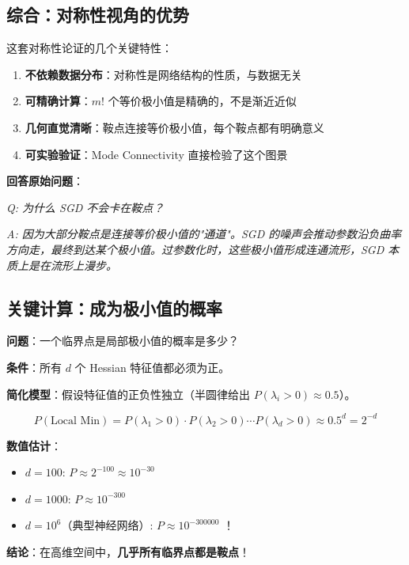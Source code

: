 \documentclass[12pt, a4paper]{ctexart}
\begin{document}
\subsection{综合：对称性视角的优势}

\begin{keypoint}[对称性视角的优势]

这套对称性论证的几个关键特性：

\begin{enumerate}
    \item \textbf{不依赖数据分布}：对称性是网络结构的性质，与数据无关
    \item \textbf{可精确计算}：$m!$ 个等价极小值是精确的，不是渐近近似
    \item \textbf{几何直觉清晰}：鞍点连接等价极小值，每个鞍点都有明确意义
    \item \textbf{可实验验证}：Mode Connectivity 直接检验了这个图景
\end{enumerate}

\textbf{回答原始问题}：

\textit{Q: 为什么 SGD 不会卡在鞍点？}

\textit{A: 因为大部分鞍点是连接等价极小值的"通道"。SGD 的噪声会推动参数沿负曲率方向走，最终到达某个极小值。过参数化时，这些极小值形成连通流形，SGD 本质上是在流形上漫步。}
\end{keypoint}

\subsection{关键计算：成为极小值的概率}

\begin{blackboard}

\textbf{问题}：一个临界点是局部极小值的概率是多少？

\textbf{条件}：所有 $d$ 个 Hessian 特征值都必须为正。

\textbf{简化模型}：假设特征值的正负性独立（半圆律给出 $P(\lambda_i > 0) \approx 0.5$）。

\[
P(\text{Local Min}) = P(\lambda_1 > 0) \cdot P(\lambda_2 > 0) \cdots P(\lambda_d > 0) \approx 0.5^d = 2^{-d}
\]

\textbf{数值估计}：
\begin{itemize}
    \item $d = 100$: $P \approx 2^{-100} \approx 10^{-30}$
    \item $d = 1000$: $P \approx 10^{-300}$
    \item $d = 10^6$（典型神经网络）: $P \approx 10^{-300000}$ ！
\end{itemize}

\textbf{结论}：在高维空间中，\textbf{几乎所有临界点都是鞍点}！

\end{blackboard}
\end{document}
